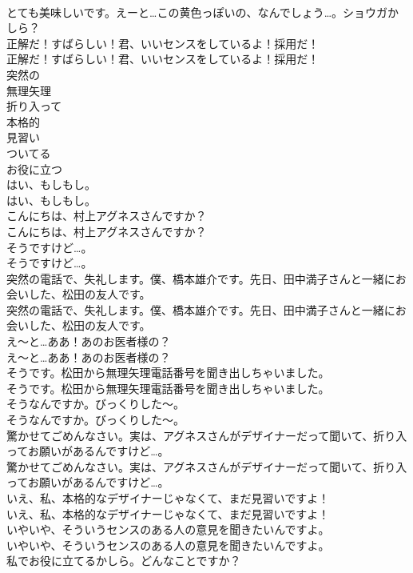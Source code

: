 \documentclass[8pt]{extreport}
\begin{document}
\begin{CJK}{UTF8}{min}
\\	とても美味しいです。えーと…この黄色っぽいの、なんでしょう…。ショウガかしら？ 
\\	正解だ！すばらしい！君、いいセンスをしているよ！採用だ！	
\\	正解だ！すばらしい！君、いいセンスをしているよ！採用だ！ 
\\	突然の
\\	無理矢理
\\	折り入って
\\	本格的
\\	見習い
\\	ついてる
\\	お役に立つ
\\	はい、もしもし。	
\\	はい、もしもし。 
\\	こんにちは、村上アグネスさんですか？	
\\	こんにちは、村上アグネスさんですか？ 
\\	そうですけど…。	
\\	そうですけど…。 
\\	突然の電話で、失礼します。僕、橋本雄介です。先日、田中満子さんと一緒にお会いした、松田の友人です。	
\\	突然の電話で、失礼します。僕、橋本雄介です。先日、田中満子さんと一緒にお会いした、松田の友人です。 
\\	え～と…ああ！あのお医者様の？	
\\	え～と…ああ！あのお医者様の？ 
\\	そうです。松田から無理矢理電話番号を聞き出しちゃいました。	
\\	そうです。松田から無理矢理電話番号を聞き出しちゃいました。 
\\	そうなんですか。びっくりした～。	
\\	そうなんですか。びっくりした～。 
\\	驚かせてごめんなさい。実は、アグネスさんがデザイナーだって聞いて、折り入ってお願いがあるんですけど…。	
\\	驚かせてごめんなさい。実は、アグネスさんがデザイナーだって聞いて、折り入ってお願いがあるんですけど…。 
\\	いえ、私、本格的なデザイナーじゃなくて、まだ見習いですよ！	
\\	いえ、私、本格的なデザイナーじゃなくて、まだ見習いですよ！ 
\\	いやいや、そういうセンスのある人の意見を聞きたいんですよ。	
\\	いやいや、そういうセンスのある人の意見を聞きたいんですよ。 
\\	私でお役に立てるかしら。どんなことですか？	

\end{CJK}
\end{document}
